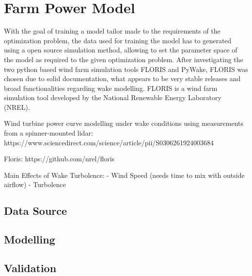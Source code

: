 
\chapter{Farm Power Model}\label{chapter:introduction}

With the goal of training a model tailor made to the requirements of the optimization problem, the data used for training the model has to generated using a open source simulation method, allowing to set the parameter space of the model as required to the given optimization problem. After investigating the two python based wind farm simulation tools FLORIS and PyWake, FLORIS was chosen due to solid documentation, what appears to be very stable releases and broad functionalities regarding wake modelling. FLORIS is a wind farm simulation tool developed by the National Renewable Energy Laboratory (NREL).



Wind turbine power curve modelling under wake conditions using measurements from a spinner-mounted lidar:
https://www.sciencedirect.com/science/article/pii/S0306261924003684

Floris:
https://github.com/nrel/floris



Main Effects of Wake Turbolence: 
- Wind Speed (needs time to mix with outside airflow)
- Turbolence
\section{Data Source}

\section{Modelling}

\section{Validation}